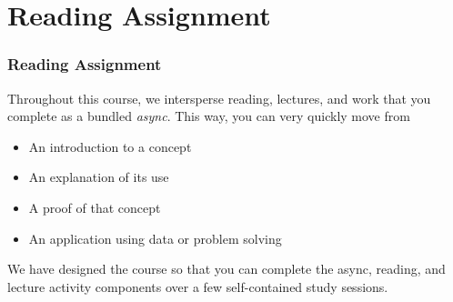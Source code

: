 \documentclass[12pt, block=fill]{beamer}
\begin{document}







%


\section{Reading Assignment}

\begin{frame}
  \frametitle{Reading Assignment}
  Throughout this course, we intersperse reading, lectures, and work
  that you complete as a bundled \textit{async}. This way, you can
  very quickly move from 
  \begin{itemize}
  \item An introduction to a concept
  \item An explanation of its use
  \item A proof of that concept 
  \item An application using data or problem solving
  \end{itemize}
  We have designed the course so that you can complete the async,
  reading, and lecture activity components over a few self-contained
  study sessions.
\end{frame}
\end{document}
